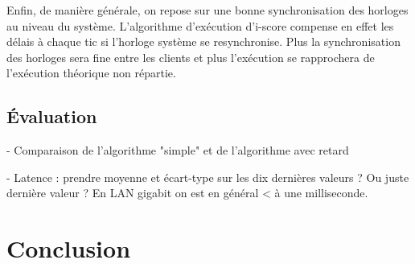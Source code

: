 \documentclass{article}
\begin{document}



Enfin, de manière générale, on repose sur une bonne synchronisation des horloges au niveau du système.
L'algorithme d'exécution d'i-score compense en effet les délais à chaque tic si l'horloge système se resynchronise.
Plus la synchronisation des horloges sera fine entre les clients et plus l'exécution se rapprochera de l'exécution théorique non répartie.


\subsection{Évaluation}
- Comparaison de l'algorithme "simple" et de l'algorithme avec retard


- Latence : prendre moyenne et écart-type sur les dix dernières valeurs ? Ou juste dernière valeur ?
En LAN gigabit on est en général < à une milliseconde.

\section{Conclusion}



\printbibliography 
\end{document}
